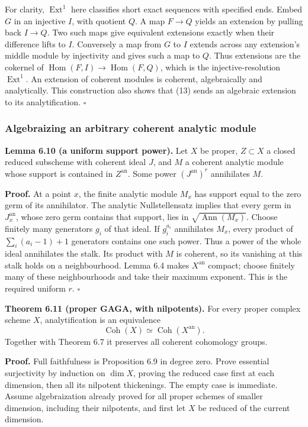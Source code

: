 \documentclass[11pt]{article}
\begin{document}
For clarity, \(\operatorname{Ext}^1\) here classifies short exact
sequences with specified ends. Embed \(G\) in an injective \(I\), with
quotient \(Q\). A map \(F\to Q\) yields an extension by pulling back
\(I\to Q\). Two such maps give equivalent extensions exactly when their
difference lifts to \(I\). Conversely a map from \(G\) to \(I\) extends
across any extension's middle module by injectivity and gives such a map
to \(Q\). Thus extensions are the cokernel of
\(\operatorname{Hom}(F,I)\to\operatorname{Hom}(F,Q)\), which is the
injective-resolution \(\operatorname{Ext}^1\). An extension of coherent
modules is coherent, algebraically and analytically. This construction
also shows that (13) sends an algebraic extension to its
analytification. \(\square\)

\subsubsection{Algebraizing an arbitrary coherent analytic
module}\label{algebraizing-an-arbitrary-coherent-analytic-module}

\textbf{Lemma 6.10 (a uniform support power).} Let \(X\) be proper,
\(Z\subset X\) a closed reduced subscheme with coherent ideal \(J\), and
\(M\) a coherent analytic module whose support is contained in
\(Z^{\mathrm{an}}\). Some power \((J^{\mathrm{an}})^r\) annihilates
\(M\).

\textbf{Proof.} At a point \(x\), the finite analytic module \(M_x\) has
support equal to the zero germ of its annihilator. The analytic
Nullstellensatz implies that every germ in \(J^{\mathrm{an}}_x\), whose
zero germ contains that support, lies in
\(\sqrt{\operatorname{Ann}(M_x)}\). Choose finitely many generators
\(g_i\) of that ideal. If \(g_i^{a_i}\) annihilates \(M_x\), every
product of \(\sum_i(a_i-1)+1\) generators contains one such power. Thus
a power of the whole ideal annihilates the stalk. Its product with \(M\)
is coherent, so its vanishing at this stalk holds on a neighbourhood.
Lemma 6.4 makes \(X^{\mathrm{an}}\) compact; choose finitely many of
these neighbourhoods and take their maximum exponent. This is the
required uniform \(r\). \(\square\)

\textbf{Theorem 6.11 (proper GAGA, with nilpotents).} For every proper
complex scheme \(X\), analytification is an equivalence \[
\operatorname{Coh}(X)\simeq\operatorname{Coh}(X^{\mathrm{an}}).
\] Together with Theorem 6.7 it preserves all coherent cohomology
groups.

\textbf{Proof.} Full faithfulness is Proposition 6.9 in degree zero.
Prove essential surjectivity by induction on \(\dim X\), proving the
reduced case first at each dimension, then all its nilpotent
thickenings. The empty case is immediate. Assume algebraization already
proved for all proper schemes of smaller dimension, including their
nilpotents, and first let \(X\) be reduced of the current dimension.
\end{document}

